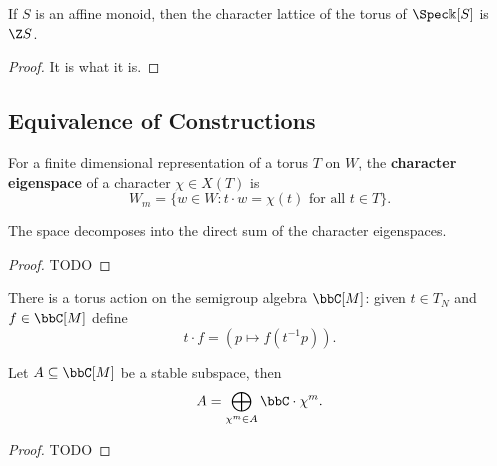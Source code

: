 \begin{proposition}
  \label{1-1-14-char-spec-aff-mon-alg}

  If $S$ is an affine monoid, then the character lattice of the torus of $\Spec \Bbbk[S]$ is $\Z S$.
\end{proposition}
\begin{proof}

  It is what it is.
\end{proof}


\subsection{Equivalence of Constructions}


\begin{definition}
  \label{1-1-char-eigenspace}

  For a finite dimensional representation of a torus $T$ on $W$, the {\bf character eigenspace} of a character $\chi \in X(T)$ is
  \[
    W_m = \{w\in W : t\cdot w = \chi(t)\text{ for all } t\in T \}.
  \]
\end{definition}


\begin{proposition}
  \label{1-1-2-char-eigenspace-direct-sum}

  The space decomposes into the direct sum of the character eigenspaces.
\end{proposition}
\begin{proof}
  \uses{}

  TODO
\end{proof}

\begin{definition}
  \label{1-1-tor-act-alg}

  There is a torus action on the semigroup algebra $\bbC[M]$: given $t\in T_N$ and $f\in \bbC[M]$ define
  \[
    t \cdot f = (p \mapsto f(t^{-1}p)).
  \]
\end{definition}


\begin{lemma}
  \label{1-1-16-total-red}
    Let $A \subseteq \bbC[M]$ be a stable subspace, then
    \[
      A = \bigoplus_{\chi^m \in A} \bbC \cdot \chi^m.
    \]
\end{lemma}
\begin{proof}

  TODO
\end{proof}


